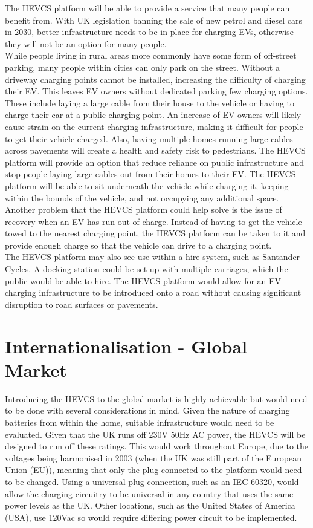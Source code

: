 \documentclass [12pt]{article}
\begin{document}
The HEVCS platform will be able to provide a service that many people can benefit from. With UK legislation banning the sale of new petrol and diesel cars in 2030, better infrastructure needs to be in place for charging EVs, otherwise they will not be an option for many people.
\\
While people living in rural areas more commonly have some form of off-street parking, many people within cities can only park on the street. Without a driveway charging points cannot be installed, increasing the difficulty of charging their EV. This leaves EV owners without dedicated parking few charging options. These include laying a large cable from their house to the vehicle or having to charge their car at a public charging point. An increase of EV owners will likely cause strain on the current charging infrastructure, making it difficult for people to get their vehicle charged. Also, having multiple homes running large cables across pavements will create a health and safety risk to pedestrians. The HEVCS platform will provide an option that reduce reliance on public infrastructure and stop people laying large cables out from their homes to their EV.  The HEVCS platform will be able to sit underneath the vehicle while charging it, keeping within the bounds of the vehicle, and not occupying any additional space.
\\
Another problem that the HEVCS platform could help solve is the issue of recovery when an EV has run out of charge. Instead of having to get the vehicle towed to the nearest charging point, the HEVCS platform can be taken to it and provide enough charge so that the vehicle can drive to a charging point.
\\
The HEVCS platform may also see use within a hire system, such as Santander Cycles. A docking station could be set up with multiple carriages, which the public would be able to hire. The HEVCS platform would allow for an EV charging infrastructure to be introduced onto a road without causing significant disruption to road surfaces or pavements.

\section{Internationalisation - Global Market}\label{sec:internationalisation}

Introducing the HEVCS to the global market is highly achievable but would need to be done with several considerations in mind.
Given the nature of charging batteries from within the home, suitable infrastructure would need to be evaluated.
Given that the UK runs off 230V 50Hz AC power, the HEVCS will be designed to run off these ratings.
This would work throughout Europe, due to the voltages being harmonised in 2003 (when the UK was still part of the European Union (EU))\cite{UK_Voltage_Change}, meaning that only the plug connected to the platform would need to be changed.
Using a universal plug connection, such as an IEC 60320, would allow the charging circuitry to be universal in any country that uses the same power levels as the UK.
Other locations, such as the United States of America (USA), use 120Vac so would require differing power circuit to be implemented\cite{Voltages_And_Frequencies}.
\end{document}
